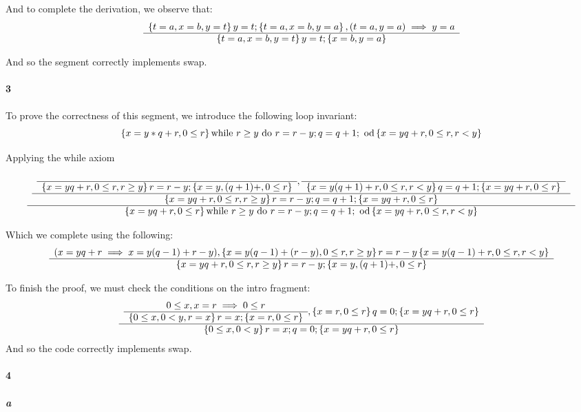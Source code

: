 \documentclass{article}
\begin{document}
And to complete the derivation, we observe that:
\begin{equation*}
\begin{array}{c} \left \{ t = a , x = b , y = t \right \} y = t;  \left \{ t = a , x = b , y = a \right \}
, (t = a , y = a) \implies y = a
 \\ \hline \left \{ t = a , x = b , y = t \right \} y = t;  \left \{ x = b , y = a \right \} \\ \end{array}
\end{equation*}

And so the segment correctly implements swap.

\paragraph{3}

To prove the correctness of this segment, we introduce the following loop invariant:
\begin{equation*}
\left \{ x = y * q + r , 0 \leq r \right \} \text{while }r \geq y \text{ do } r = r - y ; q = q + 1 ; \text{ od} \left \{ x = y q + r , 0 \leq r , r < y \right \}
\end{equation*}

Applying the while axiom
\begin{equation*}
\begin{array}{c}  
\begin{array}{c} 
\begin{array}{c}  \\ \hline \left \{ x = yq + r, 0 \leq r , r \geq y \right \} r = r - y; \left \{ x = y , (q + 1) + , 0 \leq r \right \} \\ \end{array}
,
\begin{array}{c}  \\ \hline \left \{ x = y (q + 1) + r , 0 \leq r , r < y \right \} q = q + 1; \left \{ x = y q + r , 0 \leq r \right \} \\ \end{array}
 \\ \hline \left \{ x = y q + r , 0 \leq r , r \geq y  \right \}  r = r - y ; q = q + 1 ;  \left \{ x = y q + r , 0 \leq r  \right \}  \\ \end{array}  \\ \hline  \left \{ x = y q + r , 0 \leq r \right \} \text{while }r \geq y \text{ do } r = r - y ; q = q + 1 ; \text{ od} \left \{ x = y q + r , 0 \leq r , r < y \right \}  \\ \end{array}
\end{equation*}

Which we complete using the following:
\[ \begin{array}{c} 
(x = yq + r \implies x = y(q-1) + r-y) , \left \{ x = y(q-1) + (r-y) , 0 \leq r , r \geq y \right \} r = r - y \left \{ x = y(q-1) + r , 0 \leq r , r < y \right \}
 \\ \hline \left \{ x = yq + r, 0 \leq r , r \geq y \right \} r = r - y; \left \{ x = y , (q + 1) + , 0 \leq r \right \} \\ \end{array}
\]

To finish the proof, we must check the conditions on the intro fragment:
\[
\begin{array}{c} 
	\begin{array}{c} 0 \leq x , x = r \implies 0 \leq r \\ \hline \left \{ 0 \leq x , 0 < y , r = x \right \}  r = x ;  \left \{  x = r , 0 \leq r \right \} \\ \end{array}
	,
	\left \{ x = r , 0 \leq r \right \}  q = 0;  \left \{  x = yq + r , 0 \leq r \right \}
 \\ \hline 
	\left \{ 0 \leq x , 0 < y \right \} r = x ; q = 0; \left \{ x = yq + r , 0 \leq r \right \}
 \\ \end{array}
\]
And so the code correctly implements swap.


\paragraph{4}

\subparagraph{a}
\end{document}
